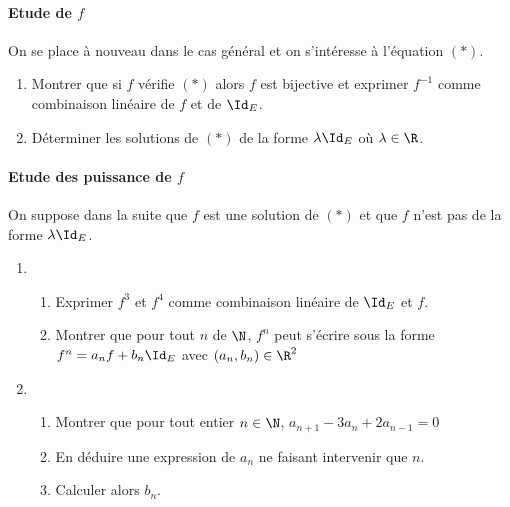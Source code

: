 \documentclass[a4paper, 11pt,reqno]{article}
\begin{document}
\paragraph{Etude de $f$}
On se place à nouveau dans le cas général et on s'intéresse à l'équation $(*)$.
\begin{enumerate}
\item Montrer que si $f$ vérifie $(*)$ alors $f$ est bijective et exprimer $f^{-1}$ comme combinaison linéaire de $f$ et de $ \Id_E$. 
\item Déterminer les solutions de $(*)$ de la forme $\lambda \Id_E$ où $\lambda \in \R$. 
\end{enumerate}


\paragraph{Etude des puissance de $f$}
On suppose dans la suite que $f$ est une solution de $(*)$ et que $f$ n'est pas de la forme $\lambda \Id_E$. 
\begin{enumerate}
\item \begin{enumerate}
\item Exprimer $f^3$ et $f^4$ comme combinaison linéaire de $\Id_E$ et $f$. 
\item Montrer que pour tout $n$ de $\N$, $f^n$ peut s'écrire sous la forme $f^n = a_n f +b_n \Id_E$ avec $(a_n,b_n) \in \R^2$

\end{enumerate}
\item \begin{enumerate}
\item Montrer que pour tout entier $n\in \N$, $a_{n+1} -3a_n +2a_{n-1} = 0$
\item En déduire une expression de $a_n$ ne faisant intervenir que $n$. 
\item Calculer alors $b_n$.
\end{enumerate}

\end{enumerate}
\end{document}
